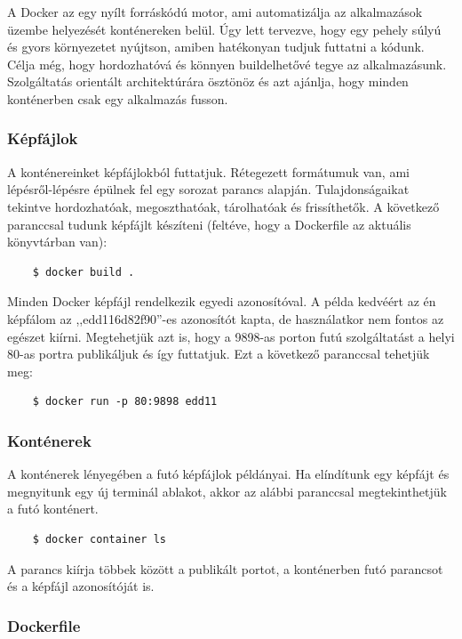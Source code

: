 \documentclass{thesis-ekf}
\theoremstyle{definition}
\theoremstyle{remark}
\begin{document}
A Docker az egy nyílt forráskódú motor, ami automatizálja az alkalmazások üzembe helyezését konténereken belül.
Úgy lett tervezve, hogy egy pehely súlyú és gyors környezetet nyújtson, amiben hatékonyan tudjuk futtatni a kódunk.
Célja még, hogy hordozhatóvá és könnyen buildelhetővé tegye az alkalmazásunk.
Szolgáltatás orientált architektúrára ösztönöz és azt ajánlja, hogy minden konténerben csak egy alkalmazás fusson.\cite{docker}

\subsubsection{Képfájlok}

A konténereinket képfájlokból futtatjuk.
Rétegezett formátumuk van, ami lépésről-lépésre épülnek fel egy sorozat parancs alapján.
Tulajdonságaikat tekintve hordozhatóak, megoszthatóak, tárolhatóak és frissíthetők.
A következő paranccsal tudunk képfájlt készíteni (feltéve, hogy a Dockerfile az aktuális könyvtárban van):

\begin{verbatim}
	$ docker build .
\end{verbatim}

Minden Docker képfájl rendelkezik egyedi azonosítóval.
A példa kedvéért az én képfálom az ,,edd116d82f90''-es azonosítót kapta, de használatkor nem fontos az egészet kiírni.
Megtehetjük azt is, hogy a 9898-as porton futú szolgáltatást a helyi 80-as portra publikáljuk és így futtatjuk.
Ezt a következő paranccsal tehetjük meg:

\begin{verbatim}
	$ docker run -p 80:9898 edd11
\end{verbatim}

\subsubsection{Konténerek}

A konténerek lényegében a futó képfájlok példányai.
Ha elíndítunk egy képfájt és megnyitunk egy új terminál ablakot, akkor az alábbi paranccsal megtekinthetjük a futó konténert.

\begin{verbatim}
	$ docker container ls
\end{verbatim}

A parancs kiírja többek között a publikált portot, a konténerben futó parancsot és a képfájl azonosítóját is.

\subsubsection{Dockerfile}
\end{document}
